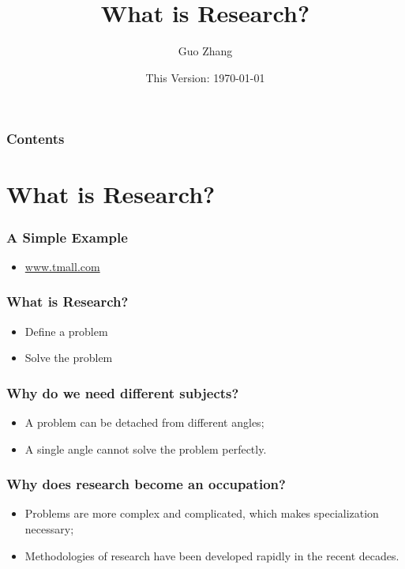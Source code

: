 \documentclass{beamer}
\title{What is Research?}
\author{Guo Zhang}
\institute{WISE, Xiamen University}
\date{This Version: \today}
\begin{document}
\begin{frame}
\maketitle
\end{frame}

\begin{frame}[plain]
\frametitle{Contents}
\tableofcontents %
\end{frame}

\section{What is Research?}
\begin{frame}
\frametitle{A Simple Example}
\begin{itemize}
   \item \url{www.tmall.com}
\end{itemize}
\end{frame}

\begin{frame}
\frametitle{What is Research?}
\begin{itemize}
	\item Define a problem
	\item Solve the problem
\end{itemize}
\end{frame}

\begin{frame}
\frametitle{Why do we need different subjects?}
\begin{itemize}
	\item A problem can be detached from different angles;
	\item A single angle cannot solve the problem perfectly.
\end{itemize}
\end{frame}

\begin{frame}
\frametitle{Why does research become an occupation?}
\begin{itemize}
	\item Problems are more complex and complicated, which makes specialization necessary;
	\item Methodologies of research have been developed rapidly in the recent decades.
\end{itemize}
\end{frame}
\end{document}
